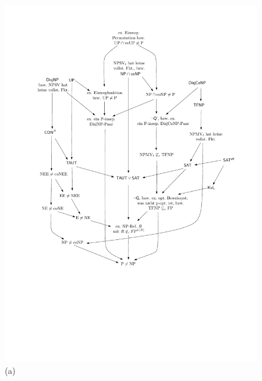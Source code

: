 \begin{figure}
    \sffamily
    \centering\includegraphics[page=3]{figures.pdf}\\\smallskip
    (a)\bigskip


\end{figure}
